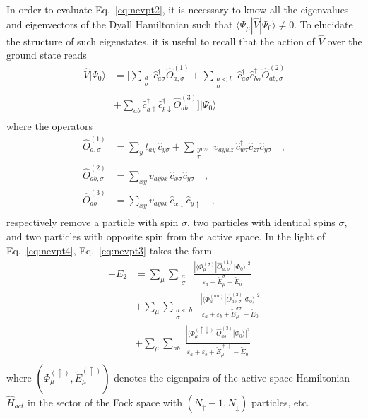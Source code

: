 \documentclass[aps,pra,twocolumn]{revtex4-2}
\newcommand{\crt}[1]{\hat{c}_{#1}^\dagger}
\newcommand{\dst}[1]{\hat{c}_{#1}^{\phantom{\dagger}}}
\begin{document}
In order to evaluate Eq.~\eqref{eq:nevpt2}, it is necessary to know all the eigenvalues and eigenvectors of the Dyall Hamiltonian 
such that $\langle \Psi_\mu | \hat{V} | \Psi_0 \rangle \neq 0$. To elucidate the structure of such eigenstates, it is useful to recall
that the action of $\hat{V}$ over the ground state reads
\begin{equation}
\label{eq:nevpt3}
\begin{split}
\hat{V} | \Psi_0 \rangle 
&= 
\Bigg[ \sum_{\substack{a \\ \sigma}} \crt{a\sigma} \hat{O}^{(1)}_{a,\sigma} + \sum_{\substack{a<b \\ \sigma}} \crt{a\sigma}\crt{b\sigma} \hat{O}^{(2)}_{ab,\sigma} \\
&+ 
\sum_{ab} \crt{a\uparrow} \crt{b\downarrow} \hat{O}^{(3)}_{ab} \Bigg] | \Psi_0 \rangle \\
\end{split}
\end{equation}
where the operators
\begin{equation}
\label{eq:nevpt4}
\begin{split}
\hat{O}^{(1)}_{a,\sigma} &= \sum_{y} t_{ay} \, \dst{y\sigma} + \sum_{ \substack{ywz \\ \tau} } v_{aywz} \, \crt{w\tau} \dst{z\tau} \dst{y\sigma} \quad, \\
\hat{O}^{(2)}_{ab,\sigma} &= \sum_{xy} v_{aybx} \, \dst{x\sigma}  \dst{y\sigma} \quad, \\
\hat{O}^{(3)}_{ab} &= \sum_{xy} v_{aybx} \, \dst{x\downarrow}  \dst{y\uparrow} \quad, \\
\end{split}
\end{equation}
respectively remove a particle with spin $\sigma$, two particles with identical spins $\sigma$, and two particles with opposite spin from the active space.
In the light of Eq.~\eqref{eq:nevpt4}, Eq.~\eqref{eq:nevpt3} takes the form
\begin{equation}
\begin{split}
\label{eq:nevpt5}
- E_2 
&= \sum_{\mu} \sum_{\substack{a \\ \sigma}} 
\;
\frac{| \langle \Phi^{(\sigma)}_\mu | \hat{O}^{(1)}_{a,\sigma} | \Phi_0 \rangle |^2}{\varepsilon_a + \tilde{E}^\sigma_\mu - \tilde{E}_0} \\
&+ \sum_{\mu} \sum_{\substack{a<b \\ \sigma}} 
\;
\frac{| \langle \Phi^{(\sigma\sigma)}_\mu | \hat{O}^{(2)}_{ab,\sigma} | \Phi_0 \rangle |^2}{\varepsilon_a + \varepsilon_{b} + \tilde{E}^{\sigma\sigma}_\mu - \tilde{E}_0} \\
&+ \sum_{\mu} \sum_{ab} 
\;
\frac{| \langle \Phi^{(\uparrow\downarrow)}_\mu | \hat{O}^{(3)}_{ab} | \Phi_0 \rangle |^2}{\varepsilon_a + \varepsilon_{b} + \tilde{E}^{\uparrow\downarrow}_\mu - \tilde{E}_0} \\
\end{split}
\end{equation}
where 
$(\Phi_\mu^{(\uparrow)},\tilde{E}^{(\uparrow)}_\mu)$
denotes the eigenpairs of the active-space Hamiltonian $\hat{H}_{act}$ 
in the sector of the Fock space with 
$(N_\uparrow-1,N_\downarrow)$ particles, etc.
\end{document}
